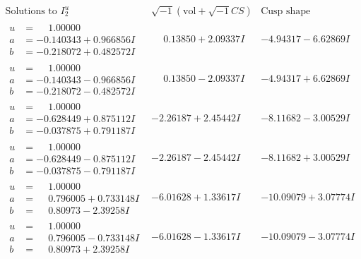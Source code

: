 \documentclass[1p]{elsarticle_modified}
\theoremstyle{definition}
\newcommand{\I}{\sqrt{-1}}
\begin{document}
$$\begin{array}{c|c|c}  
\text{Solutions to }I^u_{2}& \I (\text{vol} + \sqrt{-1}CS) & \text{Cusp shape}\\
 \hline 
\begin{aligned}
u &= \phantom{-}1.00000\phantom{ +0.000000I} \\
a &= -0.140343 + 0.966856 I \\
b &= -0.218072 + 0.482572 I\end{aligned}
 & \phantom{-}0.13850 + 2.09337 I & -4.94317 - 6.62869 I \\ \hline\begin{aligned}
u &= \phantom{-}1.00000\phantom{ +0.000000I} \\
a &= -0.140343 - 0.966856 I \\
b &= -0.218072 - 0.482572 I\end{aligned}
 & \phantom{-}0.13850 - 2.09337 I & -4.94317 + 6.62869 I \\ \hline\begin{aligned}
u &= \phantom{-}1.00000\phantom{ +0.000000I} \\
a &= -0.628449 + 0.875112 I \\
b &= -0.037875 + 0.791187 I\end{aligned}
 & -2.26187 + 2.45442 I & -8.11682 - 3.00529 I \\ \hline\begin{aligned}
u &= \phantom{-}1.00000\phantom{ +0.000000I} \\
a &= -0.628449 - 0.875112 I \\
b &= -0.037875 - 0.791187 I\end{aligned}
 & -2.26187 - 2.45442 I & -8.11682 + 3.00529 I \\ \hline\begin{aligned}
u &= \phantom{-}1.00000\phantom{ +0.000000I} \\
a &= \phantom{-}0.796005 + 0.733148 I \\
b &= \phantom{-}0.80973 - 2.39258 I\end{aligned}
 & -6.01628 + 1.33617 I & -10.09079 + 3.07774 I \\ \hline\begin{aligned}
u &= \phantom{-}1.00000\phantom{ +0.000000I} \\
a &= \phantom{-}0.796005 - 0.733148 I \\
b &= \phantom{-}0.80973 + 2.39258 I\end{aligned}
 & -6.01628 - 1.33617 I & -10.09079 - 3.07774 I \\ \hline\begin{aligned}

\end{aligned}
\end{array}$$
\end{document}
